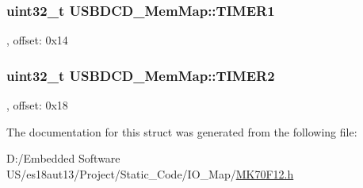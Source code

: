 \subsubsection[{T\+I\+M\+E\+R1}]{\setlength{\rightskip}{0pt plus 5cm}uint32\+\_\+t U\+S\+B\+D\+C\+D\+\_\+\+Mem\+Map\+::\+T\+I\+M\+E\+R1}\label{struct_u_s_b_d_c_d___mem_map_aa8bcdbeba3cbd7a27281d317ba5484e9}
, offset\+: 0x14 \hypertarget{struct_u_s_b_d_c_d___mem_map_abaa84a33ed5173cf08f87f3590a3f035}{}
\subsubsection[{T\+I\+M\+E\+R2}]{\setlength{\rightskip}{0pt plus 5cm}uint32\+\_\+t U\+S\+B\+D\+C\+D\+\_\+\+Mem\+Map\+::\+T\+I\+M\+E\+R2}\label{struct_u_s_b_d_c_d___mem_map_abaa84a33ed5173cf08f87f3590a3f035}
, offset\+: 0x18 

The documentation for this struct was generated from the following file\+:\begin{DoxyCompactItemize}
\item 
D\+:/\+Embedded Software U\+S/es18aut13/\+Project/\+Static\+\_\+\+Code/\+I\+O\+\_\+\+Map/\hyperlink{_m_k70_f12_8h}{M\+K70\+F12.\+h}\end{DoxyCompactItemize}
